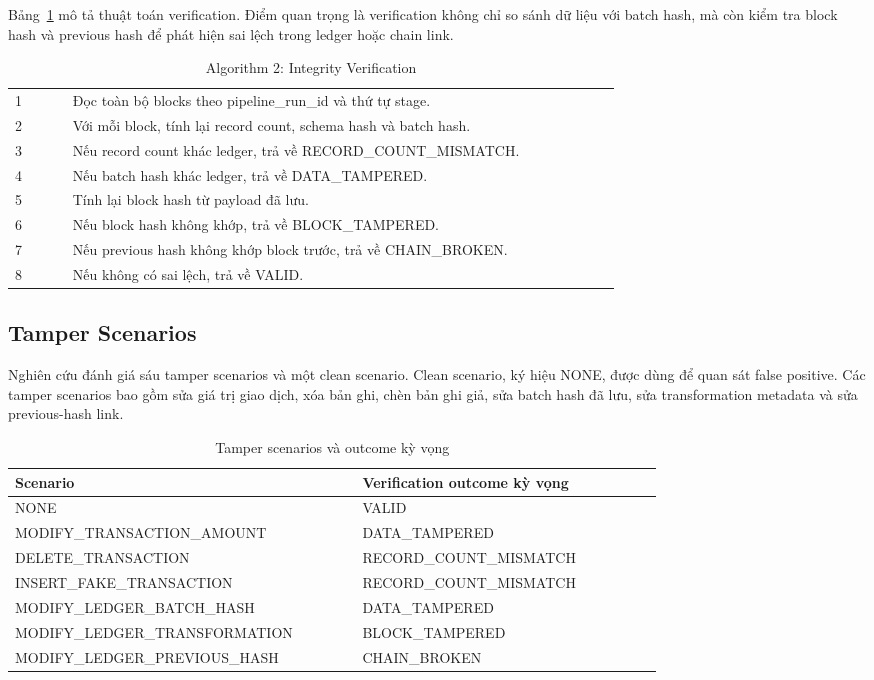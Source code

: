 Bảng~\ref{tab:algo_verify} mô tả thuật toán verification. Điểm quan trọng là verification không chỉ so sánh dữ liệu với batch hash, mà còn kiểm tra block hash và previous hash để phát hiện sai lệch trong ledger hoặc chain link.

\begin{table}[t]
\caption{Algorithm 2: Integrity Verification}
\centering
\begin{tabular}{p{0.08\linewidth}p{0.76\linewidth}}
\toprule
1 & Đọc toàn bộ blocks theo pipeline\_run\_id và thứ tự stage. \\
2 & Với mỗi block, tính lại record count, schema hash và batch hash. \\
3 & Nếu record count khác ledger, trả về RECORD\_COUNT\_MISMATCH. \\
4 & Nếu batch hash khác ledger, trả về DATA\_TAMPERED. \\
5 & Tính lại block hash từ payload đã lưu. \\
6 & Nếu block hash không khớp, trả về BLOCK\_TAMPERED. \\
7 & Nếu previous hash không khớp block trước, trả về CHAIN\_BROKEN. \\
8 & Nếu không có sai lệch, trả về VALID. \\
\bottomrule
\end{tabular}
\label{tab:algo_verify}
\end{table}

\subsection{Tamper Scenarios}

Nghiên cứu đánh giá sáu tamper scenarios và một clean scenario. Clean scenario, ký hiệu NONE, được dùng để quan sát false positive. Các tamper scenarios bao gồm sửa giá trị giao dịch, xóa bản ghi, chèn bản ghi giả, sửa batch hash đã lưu, sửa transformation metadata và sửa previous-hash link.

\begin{table}[t]
\caption{Tamper scenarios và outcome kỳ vọng}
\centering
\begin{tabular}{p{0.45\linewidth}p{0.39\linewidth}}
\toprule
\textbf{Scenario} & \textbf{Verification outcome kỳ vọng} \\
\midrule
NONE & VALID \\
MODIFY\_TRANSACTION\_AMOUNT & DATA\_TAMPERED \\
DELETE\_TRANSACTION & RECORD\_COUNT\_MISMATCH \\
INSERT\_FAKE\_TRANSACTION & RECORD\_COUNT\_MISMATCH \\
MODIFY\_LEDGER\_BATCH\_HASH & DATA\_TAMPERED \\
MODIFY\_LEDGER\_TRANSFORMATION & BLOCK\_TAMPERED \\
MODIFY\_LEDGER\_PREVIOUS\_HASH & CHAIN\_BROKEN \\
\bottomrule
\end{tabular}
\label{tab:scenarios}
\end{table}

